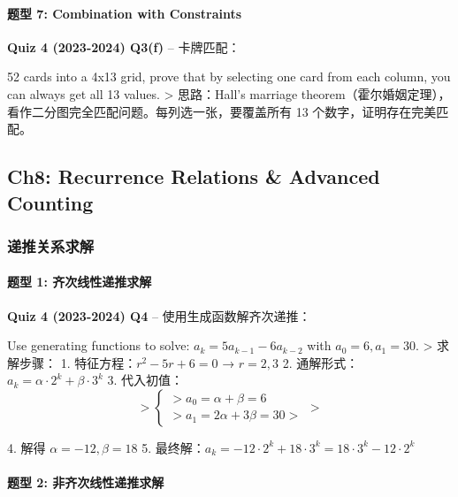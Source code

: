\documentclass[10pt,a4paper,openany]{ctexbook}
\theoremstyle{definition}
\theoremstyle{remark}
\renewenvironment{quote}
  {\list{}{\leftmargin=1em\rightmargin=0pt\topsep=0.5pt\partopsep=0pt}\item[]}
  {\endlist}
\begin{document}
\paragraph{题型 7: Combination with Constraints}

\textbf{Quiz 4 (2023-2024) Q3(f)} -- 卡牌匹配：
\begin{quote}
52 cards into a 4x13 grid, prove that by selecting one card from each column, you can always get all 13 values.
>
思路：Hall's marriage theorem（霍尔婚姻定理），看作二分图完全匹配问题。每列选一张，要覆盖所有 13 个数字，证明存在完美匹配。

\end{quote}
\vspace{-2pt}

\subsection{Ch8: Recurrence Relations \& Advanced Counting}

\subsubsection{递推关系求解}

\paragraph{题型 1: 齐次线性递推求解}

\textbf{Quiz 4 (2023-2024) Q4} -- 使用生成函数解齐次递推：
\begin{quote}
Use generating functions to solve: $a_k = 5a_{k-1} - 6a_{k-2}$ with $a_0 = 6, a_1 = 30$.
>
求解步骤：
1. 特征方程：$r^2 - 5r + 6 = 0$ → $r = 2, 3$
2. 通解形式：$a_k = \alpha \cdot 2^k + \beta \cdot 3^k$
3. 代入初值：
\[
>    \begin{cases}
>    a_0 = \alpha + \beta = 6 \\
>    a_1 = 2\alpha + 3\beta = 30
>    \end{cases}
>    
\]

4. 解得 $\alpha = -12, \beta = 18$
5. 最终解：$a_k = -12 \cdot 2^k + 18 \cdot 3^k = 18 \cdot 3^k - 12 \cdot 2^k$

\end{quote}

\paragraph{题型 2: 非齐次线性递推求解}
\end{document}
